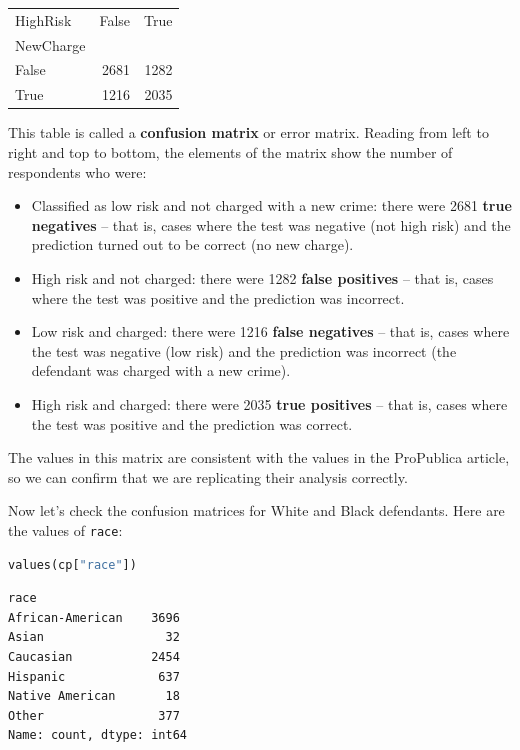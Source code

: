 \begin{tabular}{lrr}
\midrule
HighRisk & False & True \\
NewCharge &  &  \\
\midrule
False & 2681 & 1282 \\
True & 1216 & 2035 \\
\midrule
\end{tabular}

This table is called a \textbf{confusion matrix} or error matrix.
Reading from left to right and top to bottom, the elements of the matrix
show the number of respondents who were:

\begin{itemize}
\item
  Classified as low risk and not charged with a new crime: there were
  2681 \textbf{true negatives} -- that is, cases where the test was
  negative (not high risk) and the prediction turned out to be correct
  (no new charge).
\item
  High risk and not charged: there were 1282 \textbf{false positives} --
  that is, cases where the test was positive and the prediction was
  incorrect.
\item
  Low risk and charged: there were 1216 \textbf{false negatives} -- that
  is, cases where the test was negative (low risk) and the prediction
  was incorrect (the defendant was charged with a new crime).
\item
  High risk and charged: there were 2035 \textbf{true positives} -- that
  is, cases where the test was positive and the prediction was correct.
\end{itemize}

The values in this matrix are consistent with the values in the
ProPublica article, so we can confirm that we are replicating their
analysis correctly.

Now let's check the confusion matrices for White and Black defendants.
Here are the values of \passthrough{\lstinline!race!}:

\begin{lstlisting}[language=Python,style=source]
values(cp["race"])
\end{lstlisting}

\begin{lstlisting}[style=output]
race
African-American    3696
Asian                 32
Caucasian           2454
Hispanic             637
Native American       18
Other                377
Name: count, dtype: int64
\end{lstlisting}

